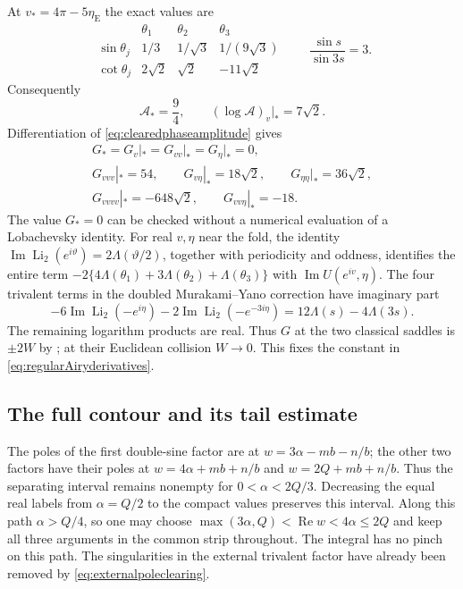\documentclass[11pt,a4paper]{article}
\numberwithin{equation}{section}
\theoremstyle{definition}
\theoremstyle{remark}
\begin{document}
At $v_*=4\pi-5\eta_{\mathrm E}$ the exact values are
\[
 \begin{array}{c|ccc}
 &\theta_1&\theta_2&\theta_3\\ \hline
 \sin\theta_j&1/3&1/\sqrt3&1/(9\sqrt3)\\
 \cot\theta_j&2\sqrt2&\sqrt2&-11\sqrt2
 \end{array}
 \qquad
 \frac{\sin s}{\sin3s}=3.
\]
Consequently
\begin{equation}
 \mathcal A_*=\frac94,\qquad
 (\log\mathcal A)_v\big|_*=7\sqrt2.
 \label{eq:regularAiryamplitude}
\end{equation}
Differentiation of \eqref{eq:clearedphaseamplitude} gives
\begin{equation}
 \begin{gathered}
 G_*=G_v|_*=G_{vv}|_*=G_\eta|_*=0,\\
 G_{vvv}|_*=54,\qquad G_{v\eta}|_*=18\sqrt2,\qquad
 G_{\eta\eta}|_*=36\sqrt2,\\
 G_{vvvv}|_*=-648\sqrt2,\qquad G_{vv\eta}|_*=-18.
 \end{gathered}
 \label{eq:regularAiryderivatives}
\end{equation}
The value $G_*=0$ can be checked without a numerical evaluation
of a Lobachevsky identity. For real $v,\eta$ near the fold,
the identity
$\operatorname{Im}\operatorname{Li}_2(e^{i\vartheta})
=2\Lambda(\vartheta/2)$, together with periodicity and
oddness, identifies the entire term
$-2\{4\Lambda(\theta_1)+3\Lambda(\theta_2)+\Lambda(\theta_3)\}$ with
$\operatorname{Im}U(e^{iv},\eta)$. The four trivalent terms
in the doubled Murakami--Yano correction have imaginary part
\[
 -6\operatorname{Im}\operatorname{Li}_2(-e^{i\eta})
 -2\operatorname{Im}\operatorname{Li}_2(-e^{-3i\eta})
 =12\Lambda(s)-4\Lambda(3s).
\]
The remaining logarithm products are real. Thus $G$ at the
two classical saddles is $\pm2W$ by
\cite[Theorem~2]{MurakamiYano}; at their Euclidean collision
$W\to0$. This fixes the constant in
\eqref{eq:regularAiryderivatives}.

\subsection{The full contour and its tail estimate}

The poles of the first double-sine factor are at
$w=3\alpha-mb-n/b$; the other two factors have their poles
at $w=4\alpha+mb+n/b$ and $w=2Q+mb+n/b$.
Thus the separating interval remains nonempty for
$0<\alpha<2Q/3$. Decreasing the equal real labels from
$\alpha=Q/2$ to the compact values preserves this interval.
Along this path $\alpha>Q/4$, so one may choose
$\max(3\alpha,Q)<\operatorname{Re}w<4\alpha\le2Q$ and keep
all three arguments in the common strip throughout.
The integral has no pinch on this path. The singularities
in the external trivalent factor have already been removed
by \eqref{eq:externalpoleclearing}.
\end{document}
